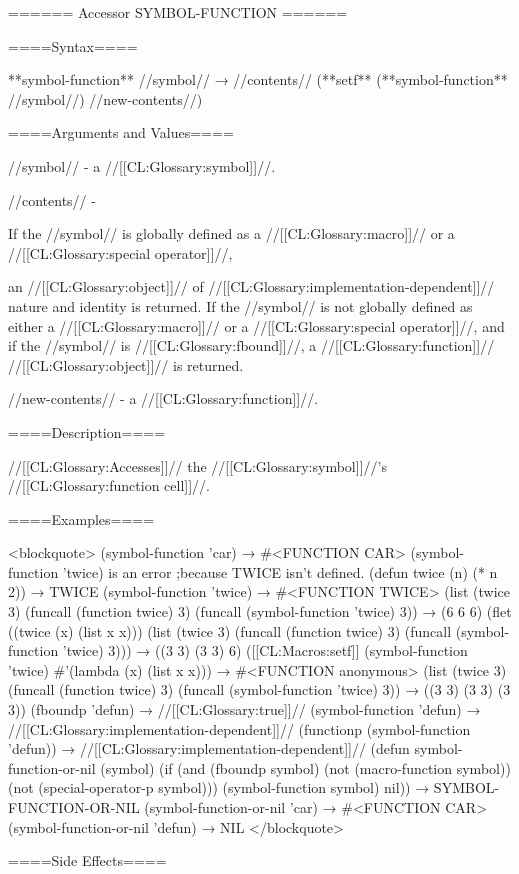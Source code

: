 ====== Accessor SYMBOL-FUNCTION ======

====Syntax====

**symbol-function** //symbol// → //contents// (**setf** (**symbol-function** //symbol//) //new-contents//)

====Arguments and Values====

//symbol// - a //[[CL:Glossary:symbol]]//.

//contents// -

If the //symbol// is globally defined as a //[[CL:Glossary:macro]]// or a //[[CL:Glossary:special operator]]//,

an //[[CL:Glossary:object]]// of //[[CL:Glossary:implementation-dependent]]// nature and identity is returned. If the //symbol// is not globally defined as either a //[[CL:Glossary:macro]]// or a //[[CL:Glossary:special operator]]//, and if the //symbol// is //[[CL:Glossary:fbound]]//, a //[[CL:Glossary:function]]// //[[CL:Glossary:object]]// is returned.

//new-contents// - a //[[CL:Glossary:function]]//.

====Description====

//[[CL:Glossary:Accesses]]// the //[[CL:Glossary:symbol]]//'s //[[CL:Glossary:function cell]]//.

====Examples====

<blockquote> (symbol-function 'car) → #<FUNCTION CAR> (symbol-function 'twice) is an error ;because TWICE isn't defined. (defun twice (n) (* n 2)) → TWICE (symbol-function 'twice) → #<FUNCTION TWICE> (list (twice 3) (funcall (function twice) 3) (funcall (symbol-function 'twice) 3)) → (6 6 6) (flet ((twice (x) (list x x))) (list (twice 3) (funcall (function twice) 3) (funcall (symbol-function 'twice) 3))) → ((3 3) (3 3) 6) ([[CL:Macros:setf]] (symbol-function 'twice) #'(lambda (x) (list x x))) → #<FUNCTION anonymous> (list (twice 3) (funcall (function twice) 3) (funcall (symbol-function 'twice) 3)) → ((3 3) (3 3) (3 3)) (fboundp 'defun) → //[[CL:Glossary:true]]// (symbol-function 'defun) → //[[CL:Glossary:implementation-dependent]]// (functionp (symbol-function 'defun)) → //[[CL:Glossary:implementation-dependent]]// (defun symbol-function-or-nil (symbol) (if (and (fboundp symbol) (not (macro-function symbol)) (not (special-operator-p symbol))) (symbol-function symbol) nil)) → SYMBOL-FUNCTION-OR-NIL (symbol-function-or-nil 'car) → #<FUNCTION CAR> (symbol-function-or-nil 'defun) → NIL </blockquote>

====Side Effects====

